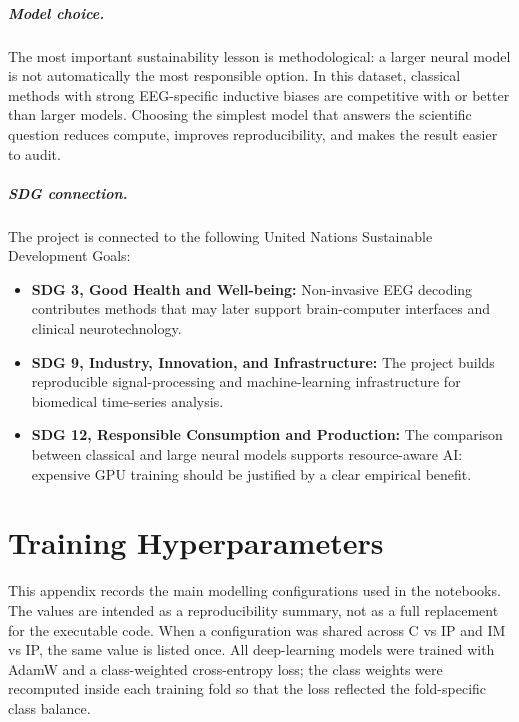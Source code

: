 \documentclass[11pt,a4paper,chapterprefix=false,parskip=false]{scrreprt}
\begin{document}
\begin{appendices}
    \paragraph{Model choice.}
    The most important sustainability lesson is methodological: a larger neural model is not automatically the most responsible option. In this dataset, classical methods with strong EEG-specific inductive biases are competitive with or better than larger models. Choosing the simplest model that answers the scientific question reduces compute, improves reproducibility, and makes the result easier to audit.

    \paragraph{SDG connection.}
    The project is connected to the following United Nations Sustainable Development Goals:
    \begin{itemize}
        \item \textbf{SDG 3, Good Health and Well-being:} Non-invasive EEG decoding contributes methods that may later support brain-computer interfaces and clinical neurotechnology.
        \item \textbf{SDG 9, Industry, Innovation, and Infrastructure:} The project builds reproducible signal-processing and machine-learning infrastructure for biomedical time-series analysis.
        \item \textbf{SDG 12, Responsible Consumption and Production:} The comparison between classical and large neural models supports resource-aware AI: expensive GPU training should be justified by a clear empirical benefit.
    \end{itemize}

    \chapter{Training Hyperparameters}
    \label{app:hyperparameters}
    This appendix records the main modelling configurations used in the notebooks. The values are intended as a reproducibility summary, not as a full replacement for the executable code. When a configuration was shared across C vs IP and IM vs IP, the same value is listed once. All deep-learning models were trained with AdamW and a class-weighted cross-entropy loss; the class weights were recomputed inside each training fold so that the loss reflected the fold-specific class balance.


\end{appendices}
\end{document}
